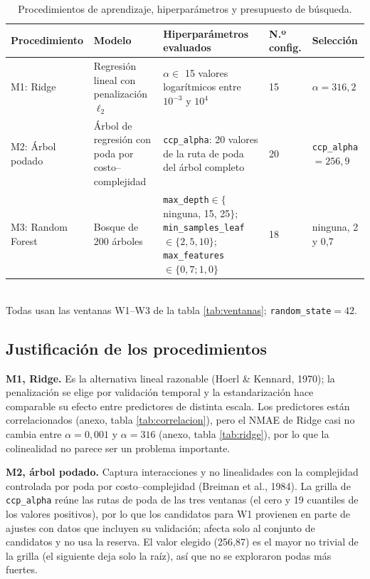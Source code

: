 \begin{table}[!htbp]
    \centering
        \caption{Procedimientos de aprendizaje, hiperparámetros y presupuesto de búsqueda.}
        \label{tab:busqueda}
        \small
        \renewcommand{\arraystretch}{1.1}
        \begin{tabular}{@{}p{2.6cm}p{3.3cm}p{5.6cm}p{1.2cm}p{2.5cm}@{}}
            \toprule
            Procedimiento & Modelo & Hiperparámetros evaluados & N.º config. & Selección \\
            \midrule
            M1: Ridge & Regresión lineal con penalización $\ell_2$ & $\alpha\in$ 15 valores logarítmicos entre $10^{-3}$ y $10^{4}$ & 15 & $\alpha=316{,}2$ \\
            M2: Árbol podado & Árbol de regresión con poda por costo--complejidad & \texttt{ccp\_alpha}: 20 valores de la ruta de poda del árbol completo & 20 & \texttt{ccp\_alpha}$=256{,}9$ \\
            M3: Random Forest & Bosque de 200 árboles & \texttt{max\_depth}$\in\{$ninguna, 15, 25$\}$; \texttt{min\_samples\_leaf}$\in\{2,5,10\}$; \texttt{max\_features}$\in\{0{,}7;1{,}0\}$ & 18 & ninguna, 2 y 0,7 \\
            \bottomrule
        \end{tabular}
    \\ Todas usan las ventanas W1--W3 de la tabla \ref{tab:ventanas}; \texttt{random\_state}$=42$.
\end{table}

\subsection{Justificación de los procedimientos}

\textbf{M1, Ridge.} Es la alternativa lineal razonable (Hoerl \& Kennard, 1970); la penalización se elige por validación temporal y la estandarización hace comparable su efecto entre predictores de distinta escala. Los predictores están correlacionados (anexo, tabla \ref{tab:correlacion}), pero el NMAE de Ridge casi no cambia entre $\alpha=0{,}001$ y $\alpha=316$ (anexo, tabla \ref{tab:ridge}), por lo que la colinealidad no parece ser un problema importante.

\textbf{M2, árbol podado.} Captura interacciones y no linealidades con la complejidad controlada por poda por costo--complejidad (Breiman et al., 1984). La grilla de \texttt{ccp\_alpha} reúne las rutas de poda de las tres ventanas (el cero y 19 cuantiles de los valores positivos), por lo que los candidatos para W1 provienen en parte de ajustes con datos que incluyen su validación; afecta solo al conjunto de candidatos y no usa la reserva. El valor elegido (256,87) es el mayor no trivial de la grilla (el siguiente deja solo la raíz), así que no se exploraron podas más fuertes.

